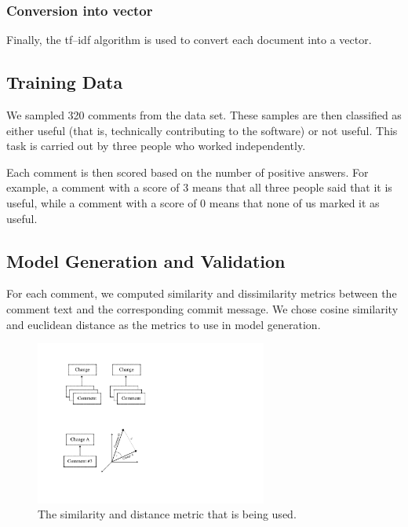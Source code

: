 \documentclass[conference]{IEEEtran}
\begin{document}
\subsubsection{Conversion into vector}

Finally, the tf--idf algorithm is used to convert each document into a vector.


\subsection{Training Data}

We sampled 320 comments from the data set.
These samples are then classified as either useful (that is, technically contributing to the software) or not useful.
This task is carried out by three people who worked independently.

Each comment is then scored based on the number of positive answers.
For example, a comment with a score of 3 means that all three people said that it is useful,
while a comment with a score of 0 means that none of us marked it as useful.



\subsection{Model Generation and Validation}

For each comment, we computed similarity and dissimilarity metrics
between the comment text and the corresponding commit message.
We chose cosine similarity and euclidean distance as the metrics to use in model generation.

\begin{figure}[h]
\centering
\includegraphics[width=3in]{vector}
\caption{The similarity and distance metric that is being used.}
\label{fig:vector}
\end{figure}
\end{document}
